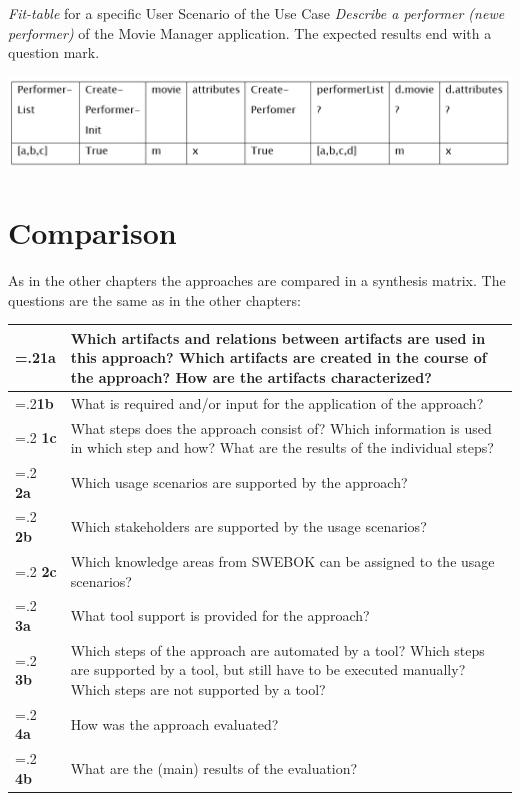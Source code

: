 \begin{table}[h!]
	\caption{\textit{Fit-table} for a specific User Scenario of the Use Case \textit{Describe a performer (newe performer)} of the Movie Manager application. The expected results end with a question mark.}
	\centering
	\includegraphics[width=\textwidth]{../images/LongoFit.png}

	
	\label{fig:fit-longo}
\end{table}

\section{Comparison}
\label{sec:comparison}

As in the other chapters the approaches are compared in a synthesis matrix.
The questions are the same as in the other chapters:

\renewcommand{\arraystretch}{1.5}
	\begin{tabularx}{\textwidth}{>{\hsize=.2\hsize}X X}
  		\textbf{1a} & Which artifacts and relations between artifacts are used in this approach? Which
artifacts are created in the course of the approach? How are the artifacts characterized?
 \\
  		\hline
  		\textbf{1b} & What is required and/or input for the application of the approach? \\
  		\hline
  		\textbf{1c} & What steps does the approach consist of? Which information is used in which step
and how? What are the results of the individual steps?
 \\
  		\hline
  		\textbf{2a} & Which usage scenarios are supported by the approach? \\
  		\hline
  		\textbf{2b} & Which stakeholders are supported by the usage scenarios? \\
  		\hline
  		\textbf{2c} &  Which knowledge areas from SWEBOK can be assigned to the usage scenarios? \\
  		\hline
  		\textbf{3a} & What tool support is provided for the approach? \\
  		\hline
  		\textbf{3b} & Which steps of the approach are automated by a tool? Which steps are supported
by a tool, but still have to be executed manually? Which steps are not supported
by a tool?
 \\
  		\hline
  		\textbf{4a} & How was the approach evaluated? \\
  		\hline
  		\textbf{4b} & What are the (main) results of the evaluation? \\
  		\end{tabularx}
  		

